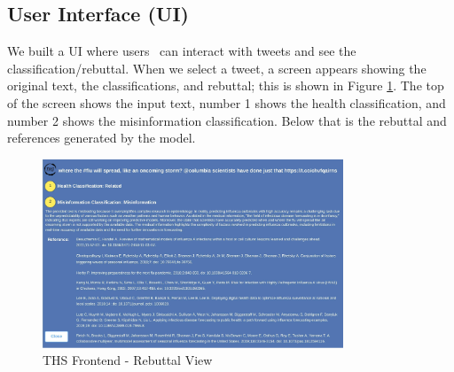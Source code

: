 \subsection{User Interface (UI)}
We built a UI where users  can interact with tweets and see the classification/rebuttal. When we select a tweet, a screen appears showing the original text, the classifications, and rebuttal; this is shown in Figure \ref{fig:frontendrebuttal}. The top of the screen shows the input text, number 1 shows the health classification, and number 2 shows the misinformation classification. Below that is the rebuttal and references generated by the model. %
\begin{figure}[!htb]
	\begin{center}
		\includegraphics[width=0.8\textwidth]{figures/THS_Rebuttal_view.jpeg} %
	\end{center}
	\caption{THS Frontend  - Rebuttal View} %
	\label{fig:frontendrebuttal}
\end{figure}






